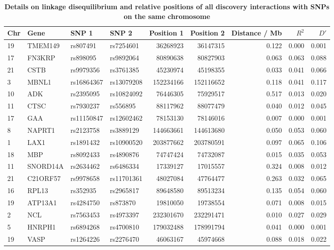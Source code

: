 \documentclass{article}
\begin{document}
\begin{table}[ht]
{\footnotesize
\begin{threeparttable}
\caption{\textbf{Details on linkage disequilibrium and relative positions of all discovery interactions with SNPs on the same chromosome}}
\label{tab:ld}
\begin{tabular}{llllrrrrr}
\hline
Chr & Gene & SNP 1 & SNP 2 & Position 1 & Position 2 & Distance / Mb & $R^2$ & $D'$ \\
\hline
19 & TMEM149 & rs807491 & rs7254601 & 36268923 & 36147315 & 0.122 & 0.000 & 0.001 \\
17 & FN3KRP & rs898095 & rs9892064 & 80890638 & 80827903 & 0.063 & 0.063 & 0.088 \\
21 & CSTB & rs9979356 & rs3761385 & 45230974 & 45198355 & 0.033 & 0.041 & 0.066 \\
3 & MBNL1 & rs16864367 & rs13079208 & 152234166 & 152116652 & 0.118 & 0.041 & 0.117 \\
10 & ADK & rs2395095 & rs10824092 & 76446305 & 75929517 & 0.517 & 0.013 & 0.020 \\
11 & CTSC & rs7930237 & rs556895 & 88117962 & 88077479 & 0.040 & 0.012 & 0.045 \\
17 & GAA & rs11150847 & rs12602462 & 78153130 & 78146016 & 0.007 & 0.000 & 0.001 \\
8 & NAPRT1 & rs2123758 & rs3889129 & 144663661 & 144613680 & 0.050 & 0.053 & 0.060 \\
1 & LAX1 & rs1891432 & rs10900520 & 203877662 & 203780591 & 0.097 & 0.065 & 0.106 \\
18 & MBP & rs8092433 & rs4890876 & 74747424 & 74732087 & 0.015 & 0.035 & 0.053 \\
11 & SNORD14A & rs2634462 & rs6486334 & 17339127 & 17015557 & 0.324 & 0.008 & 0.012 \\
21 & C21ORF57 & rs9978658 & rs11701361 & 48027084 & 47764477 & 0.263 & 0.032 & 0.065 \\
16 & RPL13 & rs352935 & rs2965817 & 89648580 & 89513234 & 0.135 & 0.054 & 0.060 \\
19 & ATP13A1 & rs4284750 & rs873870 & 19810050 & 19738554 & 0.071 & 0.008 & 0.015 \\
2 & NCL & rs7563453 & rs4973397 & 232301670 & 232291471 & 0.010 & 0.027 & 0.029 \\
5 & HNRPH1 & rs6894268 & rs4700810 & 179032488 & 178991794 & 0.041 & 0.000 & 0.001 \\
19 & VASP & rs1264226 & rs2276470 & 46063167 & 45974668 & 0.088 & 0.018 & 0.022 \\

\end{tabular}
\end{threeparttable}}
\end{table}
\end{document}
